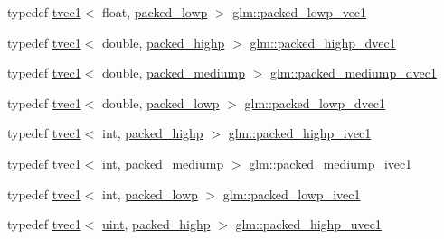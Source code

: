 \begin{DoxyCompactItemize}
\item 
typedef \mbox{\hyperlink{structglm_1_1tvec1}{tvec1}}$<$ float, \mbox{\hyperlink{namespaceglm_a0f04f086094c747d227af4425893f545ac36a4bd74559be2c0b65bc48e5953b8b}{packed\+\_\+lowp}} $>$ \mbox{\hyperlink{group__gtc__type__aligned_gaabe6eb85a9090961e1f8fc809dabc0e9}{glm\+::packed\+\_\+lowp\+\_\+vec1}}
\item 
typedef \mbox{\hyperlink{structglm_1_1tvec1}{tvec1}}$<$ double, \mbox{\hyperlink{namespaceglm_a0f04f086094c747d227af4425893f545a8e8791ee77fe079b1291f710d88031bf}{packed\+\_\+highp}} $>$ \mbox{\hyperlink{group__gtc__type__aligned_ga7aa42808654e047d026b0c066870a578}{glm\+::packed\+\_\+highp\+\_\+dvec1}}
\item 
typedef \mbox{\hyperlink{structglm_1_1tvec1}{tvec1}}$<$ double, \mbox{\hyperlink{namespaceglm_a0f04f086094c747d227af4425893f545a9604654c3b137cd7898689fd34b25bc0}{packed\+\_\+mediump}} $>$ \mbox{\hyperlink{group__gtc__type__aligned_ga225f491d0c00d40832957ed3fd431315}{glm\+::packed\+\_\+mediump\+\_\+dvec1}}
\item 
typedef \mbox{\hyperlink{structglm_1_1tvec1}{tvec1}}$<$ double, \mbox{\hyperlink{namespaceglm_a0f04f086094c747d227af4425893f545ac36a4bd74559be2c0b65bc48e5953b8b}{packed\+\_\+lowp}} $>$ \mbox{\hyperlink{group__gtc__type__aligned_ga6c11aa5a23fdd73f1981d306b3369f3f}{glm\+::packed\+\_\+lowp\+\_\+dvec1}}
\item 
typedef \mbox{\hyperlink{structglm_1_1tvec1}{tvec1}}$<$ int, \mbox{\hyperlink{namespaceglm_a0f04f086094c747d227af4425893f545a8e8791ee77fe079b1291f710d88031bf}{packed\+\_\+highp}} $>$ \mbox{\hyperlink{group__gtc__type__aligned_gaec852395d791b6ecacee46c7308db6e9}{glm\+::packed\+\_\+highp\+\_\+ivec1}}
\item 
typedef \mbox{\hyperlink{structglm_1_1tvec1}{tvec1}}$<$ int, \mbox{\hyperlink{namespaceglm_a0f04f086094c747d227af4425893f545a9604654c3b137cd7898689fd34b25bc0}{packed\+\_\+mediump}} $>$ \mbox{\hyperlink{group__gtc__type__aligned_ga0e4bfeba8aa6b0fd84abfca9d2dcc076}{glm\+::packed\+\_\+mediump\+\_\+ivec1}}
\item 
typedef \mbox{\hyperlink{structglm_1_1tvec1}{tvec1}}$<$ int, \mbox{\hyperlink{namespaceglm_a0f04f086094c747d227af4425893f545ac36a4bd74559be2c0b65bc48e5953b8b}{packed\+\_\+lowp}} $>$ \mbox{\hyperlink{group__gtc__type__aligned_ga4e0147efb3901f6459b7d2c80a1e23fd}{glm\+::packed\+\_\+lowp\+\_\+ivec1}}
\item 
typedef \mbox{\hyperlink{structglm_1_1tvec1}{tvec1}}$<$ \mbox{\hyperlink{group__core__precision_ga4fd29415871152bfb5abd588334147c8}{uint}}, \mbox{\hyperlink{namespaceglm_a0f04f086094c747d227af4425893f545a8e8791ee77fe079b1291f710d88031bf}{packed\+\_\+highp}} $>$ \mbox{\hyperlink{group__gtc__type__aligned_gaf5761ca585ef8aa7aa85efd0f62c0c39}{glm\+::packed\+\_\+highp\+\_\+uvec1}}

\end{DoxyCompactItemize}
